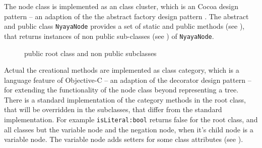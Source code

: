 The node class is implemented as an class cluster, 
which is an Cocoa design pattern \cite[p.282ff]{Buck:2009:CDP:1803585}
– an adaption of the the abstract factory design pattern \cite[p.87ff]{GAMMAETAL}.
The abstract and public class \verb+NyayaNode+ 
provides a set of static and public methods (see ),
that returns instances of non public sub-classes (see )
of \verb+NyayaNode+.

\begin{figure}[htbp]
\begin{center}
\caption{public root class and non public subclasses}
\label{fig:NyayaNodeCluster}
\end{center}
\end{figure}

Actual the creational methods are implemented as class category, 
which is a language feature of Objective-C \cite[p.225ff]{Kochan:2009:PO:1538451}
– an adaption of the decorator design pattern \cite[p.175ff]{GAMMAETAL} –
for extending the functionality of the node class beyond representing a tree. 
There is a standard implementation of the category methods in the root class,
that will be overridden in the subclasses, that differ from the standard implementation.
For example \verb+isLiteral:bool+ returns false for the root class, and all classes but the variable node
and the negation node, when it's child node is a variable node.
The variable node adds setters for some class attributes (see ).


